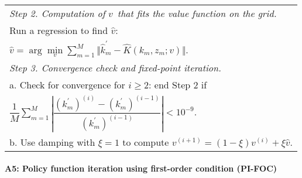 {\begin{tabular}{l}
\\ \hline
\emph{Step 2. Computation of }$v$\emph{\ that fits the value function on the
grid. } \\
\quad Run a regression to find $\widehat{v}:$ \\
\quad $\widehat{v}=\arg \underset{v}{\min }\sum_{m=1}^{M}\Vert \widehat{k}
_{m}^{\prime }-\widehat{K}(k_{m},z_{m};v)\Vert $. \\ \hline
\emph{Step 3. Convergence check and fixed-point iteration.} \\
\quad a. Check for convergence for $i\geq 2$: end Step 2 if \\
\quad $\dfrac{1}{M}\sum_{m=1}^{M}\left \vert \dfrac{(k_{m}^{\prime
})^{\left( i\right) }-(k_{m}^{\prime })^{\left( i-1\right) }}{(k_{m}^{\prime
})^{\left( i-1\right) }}\right \vert <10^{-9}.$ \\
\quad b. Use damping with $\xi =1$ to compute $v^{\left( i+1\right) }=(1-\xi
)v^{\left( i\right) }+\xi \widehat{v}$. \\ \hline \hline
\end{tabular}
}

\newpage

\paragraph{A5: Policy function iteration using first-order condition (PI-FOC)
}

\qquad

\qquad

